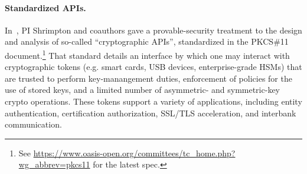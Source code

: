 
\paragraph{Standardized APIs. }
%
In~\cite{SSW}, PI Shrimpton and coauthors gave a provable-security treatment to
the design and analysis of so-called ``cryptographic APIs'', standardized in the
PKCS\#11 document.\footnote{See
\url{https://www.oasis-open.org/committees/tc_home.php?wg_abbrev=pkcs11} for the
latest spec.} That standard details an interface by which one may interact with
cryptographic tokens (e.g. smart cards, USB devices, enterprise-grade HSMs) that
are trusted to perform key-manangement duties, enforcement of policies for the
use of stored keys, and a limited number of asymmetric- and symmetric-key crypto
operations.  These tokens support a variety of applications, including entity
authentication, certification authorization, SSL/TLS acceleration, and interbank
communication.
%

